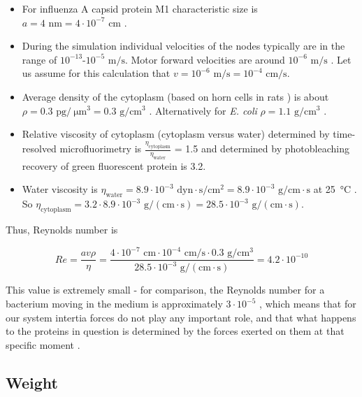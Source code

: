 \begin{itemize}
\item For influenza A capsid protein M1 characteristic size is $a = 4 \text{ nm} = 4 \cdot 10^{-7} \text{ cm}$ \cite{shtykova2013structural}.
\item During the simulation individual velocities of the nodes typically are in the range of $10^{-13}$-$10^{-5} \text{ m/s}$. Motor forward velocities are around $10^{-6} \text{ m/s}$ \cite{muller2008tug}. Let us assume for this calculation that $v = 10^{-6} \text{ m/s} = 10^{-4} \text{ cm/s}$.
\item Average density of the cytoplasm (based on horn cells in rats \cite{hartmann1967cytoplasmic}) is about $\rho = 0.3 \text{ pg}/\SI{}{\micro\meter}^3 = 0.3 \text{ g}/\text{cm}^3$ . Alternatively for \textit{E. coli} $\rho = 1.1 \text{ g}/\text{cm}^3$ \cite{loferer1998determination}.
\item Relative viscosity of cytoplasm (cytoplasm versus water) determined by time-resolved microfluorimetry \cite{swaminathan1997photobleaching} is $\frac{\eta_\text{cytoplasm}}{\eta_\text{water}}$ = 1.5 and determined by photobleaching recovery of green fluorescent protein \cite{swaminathan1997photobleaching} is 3.2.
\item Water viscosity is $\eta_\text{water} = 8.9 \cdot 10^{-3} \text{ dyn} \cdot \text{s}/\text{cm}^2 = 8.9 \cdot 10^{-3} \text{ g}/\text{cm} \cdot \text{s} $ at \SI{25}{\degreeCelsius} \cite{IAPWS2008}. So $\eta_\text{cytoplasm} = 3.2 \cdot 8.9 \cdot 10^{-3} \text{ g}/(\text{cm} \cdot \text{s}) = 28.5 \cdot 10^{-3} \text{ g}/(\text{cm} \cdot \text{s})$.
\end{itemize}

Thus, Reynolds number is

\begin{equation}
Re = \frac{av\rho}{\eta} = \frac{4 \cdot 10^{-7} \text{ cm} \cdot 10^{-4} \text{ cm/s} \cdot 0.3 \text{ g}/\text{cm}^3}{28.5 \cdot 10^{-3} \text{ g}/(\text{cm} \cdot \text{s})} = 4.2 \cdot 10^{-10}
\end{equation}

This value is extremely small - for comparison, the Reynolds number for a bacterium moving in the medium is approximately $3\cdot 10^{-5}$ \cite{purcell1977life}, which means that for our system intertia forces do not play any important role, and that what happens to the proteins in question is determined by the forces exerted on them at that specific moment \cite{purcell1977life}.

\subsection{Weight}

